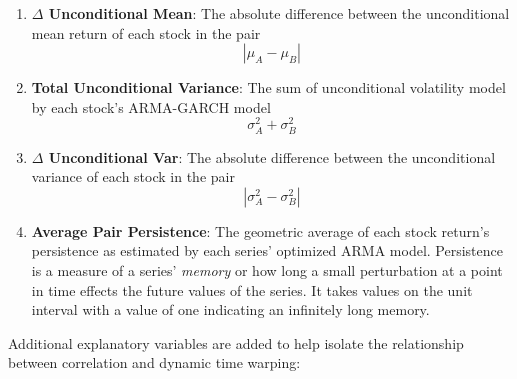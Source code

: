 \begin{enumerate}
    \item \textbf{$\Delta$ Unconditional Mean}: The absolute difference between the unconditional mean return of each stock in the pair
    \begin{equation}
        |\mu_{A} - \mu_{B}|
    \end{equation}
    \item \textbf{Total Unconditional Variance}: The sum of unconditional volatility model by each stock's ARMA-GARCH model
    \begin{equation}
        \sigma^{2}_{A} + \sigma^{2}_{B}
    \end{equation}
    \item \textbf{$\Delta$ Unconditional Var}: The absolute difference between the unconditional variance of each stock in the pair
    \begin{equation}
        |\sigma^{2}_{A} - \sigma^{2}_{B}|
    \end{equation}
    \item \textbf{Average Pair Persistence}: The geometric average of each stock return's persistence as estimated by each series' optimized ARMA model. Persistence is a measure of a series' \textit{memory} or how long a small perturbation at a point in time effects the future values of the series. It takes values on the unit interval with a value of one indicating an infinitely long memory.
\end{enumerate}

Additional explanatory variables are added to help isolate the relationship between correlation and dynamic time warping:

